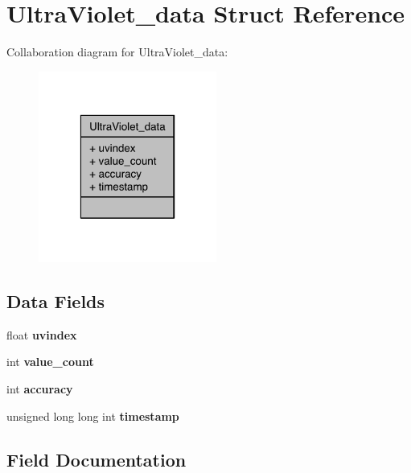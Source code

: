 \section{Ultra\-Violet\-\_\-data Struct Reference}
\label{structUltraViolet__data}


Collaboration diagram for Ultra\-Violet\-\_\-data\-:\nopagebreak
\begin{figure}[H]
\begin{center}
\leavevmode
\includegraphics[width=166pt]{structUltraViolet__data__coll__graph}
\end{center}
\end{figure}
\subsection*{Data Fields}
\begin{DoxyCompactItemize}
\item 
float {\bfseries uvindex}\label{structUltraViolet__data_a7f11f20fcda81e9d4fa76ad1910d602f}

\item 
int {\bfseries value\-\_\-count}\label{structUltraViolet__data_a38ed7510ea67954b8fa44c5e329b4a34}

\item 
int {\bfseries accuracy}\label{structUltraViolet__data_a65fcb870a5c67c956ea6e7f8040821d9}

\item 
unsigned long long int {\bfseries timestamp}\label{structUltraViolet__data_a676d3ccfcc6b156823b22286d75e230b}

\end{DoxyCompactItemize}


\subsection{Field Documentation}
